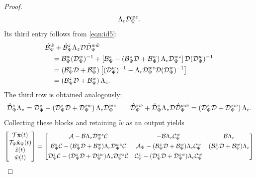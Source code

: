 \begin{proof}
\begin{align*}
             \Lambda_c\mathcal{D}_\Psi^{wz}.
\end{align*}
Its third entry follows from \eqref{eqn:id5}:
\begin{align*}
    &\hat{\mathcal{B}}_\Psi^{\tilde{w}}
        +\hat{\mathcal{B}}_\Psi^z\Lambda_z\mathcal{D}
         \hat{\mathcal{D}}_\Psi^{w\tilde{w}}\\
    &\quad =
        \mathcal{B}_\Psi^w(\mathcal{D}_\Psi^w)^{-1}
        +\left[
            \mathcal{B}_\Psi^z
            -\left(\mathcal{B}_\Psi^z\mathcal{D}+\mathcal{B}_\Psi^w\right)
             \Lambda_c\mathcal{D}_\Psi^{wz}
         \right]\mathcal{D}(\mathcal{D}_\Psi^w)^{-1}\\
    &\quad =
        \left(\mathcal{B}_\Psi^z\mathcal{D}+\mathcal{B}_\Psi^w\right)
        \left[
            (\mathcal{D}_\Psi^w)^{-1}
            -\Lambda_c\mathcal{D}_\Psi^{wz}\mathcal{D}
             (\mathcal{D}_\Psi^w)^{-1}
        \right]\\
    &\quad =
        \left(\mathcal{B}_\Psi^z\mathcal{D}+\mathcal{B}_\Psi^w\right)\Lambda_c.
\end{align*}
The third row is obtained analogously:
\begin{equation*}
    \hat{\mathcal{D}}_\Psi^z\Lambda_z
        = \mathcal{D}_\Psi^z
           -\left(\mathcal{D}_\Psi^z\mathcal{D}+\mathcal{D}_\Psi^{zw}\right)
            \Lambda_c\mathcal{D}_\Psi^{wz} \qquad
    \hat{\mathcal{D}}_\Psi^{z\tilde{w}}
        +\hat{\mathcal{D}}_\Psi^z\Lambda_z\mathcal{D}
         \hat{\mathcal{D}}_\Psi^{w\tilde{w}}\\
    =
        \left(\mathcal{D}_\Psi^z\mathcal{D}+\mathcal{D}_\Psi^{zw}\right)\Lambda_c.
\end{equation*}
Collecting these blocks and retaining $\tilde{w}$ as an output yields
\begin{equation}\label{eqn:congruence}
    \begin{bmatrix}\mathcal{T} \dot{\mathbf{x}}(t) \\ \mathcal{T}_\Psi\dot{\mathbf{x}}_\Psi(t)\\ \tilde{z}(t) \\ \tilde{w}(t)\end{bmatrix} = 
    \begin{bmatrix}\mathcal{A} - \mathcal{B}\Lambda_c\mathcal{D}_\Psi^{wz}\mathcal{C} & -\mathcal{B}\Lambda_c\mathcal{C}_\Psi^w & \mathcal{B}\Lambda_c \\[4pt]
    \mathcal{B}_\Psi^z \mathcal{C} - (\mathcal{B}_\Psi^z \mathcal{D} + \mathcal{B}_\Psi^w)\Lambda_c\mathcal{D}_\Psi^{wz}\mathcal{C} 
    & \mathcal{A}_\Psi - (\mathcal{B}_\Psi^z \mathcal{D} + \mathcal{B}_\Psi^w)\Lambda_c\mathcal{C}_\Psi^w 
    & (\mathcal{B}_\Psi^z \mathcal{D} + \mathcal{B}_\Psi^w)\Lambda_c \\[4pt]
    \mathcal{D}_\Psi^z \mathcal{C} - (\mathcal{D}_\Psi^z \mathcal{D} + \mathcal{D}_\Psi^{zw})\Lambda_c\mathcal{D}_\Psi^{wz}\mathcal{C} 
    & \mathcal{C}_\Psi^z - (\mathcal{D}_\Psi^z \mathcal{D} + \mathcal{D}_\Psi^{zw})\Lambda_c\mathcal{C}_\Psi^w 
\end{bmatrix}
\end{equation}
\end{proof}
